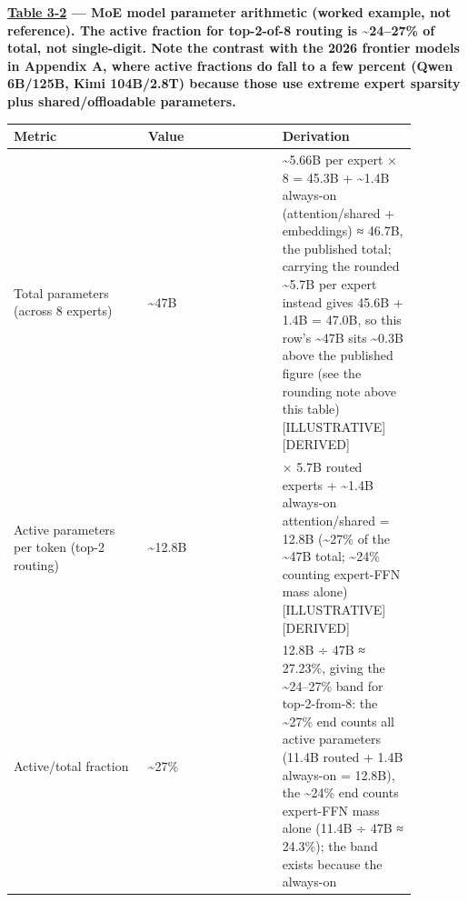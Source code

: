 
\textbf{\hyperref[tab:3.2]{Table 3-2} --- MoE model parameter arithmetic (worked example,
not reference). The active fraction for top-2-of-8 routing is
\textasciitilde24--27\% of total, not single-digit. Note the contrast
with the 2026 frontier models in Appendix A, where active fractions do
fall to a few percent (Qwen 6B/125B, Kimi 104B/2.8T) because those use
extreme expert sparsity plus shared/offloadable parameters.}

\nopagebreak[4]
\begin{longtable}[]{@{}
  >{\raggedright\arraybackslash}p{0.2927\linewidth}
  >{\raggedright\arraybackslash}p{0.2927\linewidth}
  >{\raggedright\arraybackslash}p{0.2927\linewidth}@{}}
\toprule\noalign{}
\begin{minipage}[b]{\linewidth}\raggedright
Metric
\end{minipage} & \begin{minipage}[b]{\linewidth}\raggedright
Value
\end{minipage} & \begin{minipage}[b]{\linewidth}\raggedright
Derivation
\end{minipage} \\
\midrule\noalign{}
\endhead
\bottomrule\noalign{}
\endlastfoot
Total parameters (across 8 experts) & \textasciitilde47B &
\textasciitilde5.66B per expert × 8 = 45.3B + \textasciitilde1.4B
always-on (attention/shared + embeddings) ≈ 46.7B, the published total;
carrying the rounded \textasciitilde5.7B per expert instead gives 45.6B
+ 1.4B = 47.0B, so this row's \textasciitilde47B sits
\textasciitilde0.3B above the published figure (see the rounding note
above this table) \mbox{{[}ILLUSTRATIVE{]}}\hspace{0pt}\mbox{{[}DERIVED{]}} \\
\noalign{\label{tab:3.2}}
Active parameters per token (top-2 routing) & \textasciitilde12.8B & 2 ×
5.7B routed experts + \textasciitilde1.4B always-on attention/shared =
12.8B (\textasciitilde27\% of the \textasciitilde47B total;
\textasciitilde24\% counting expert-FFN mass alone)
\mbox{{[}ILLUSTRATIVE{]}}\hspace{0pt}\mbox{{[}DERIVED{]}} \\
Active/total fraction & \textasciitilde27\% & 12.8B ÷ 47B ≈ 27.23\%,
giving the \textasciitilde24--27\% band for top-2-from-8: the
\textasciitilde27\% end counts all active parameters (11.4B routed +
1.4B always-on = 12.8B), the \textasciitilde24\% end counts expert-FFN
mass alone (11.4B ÷ 47B ≈ 24.3\%); the band exists because the always-on

\end{longtable}
